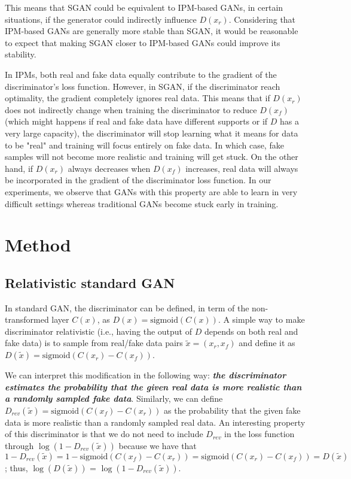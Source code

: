 \documentclass{article}
\begin{document}
This means that SGAN could be equivalent to IPM-based GANs, in certain situations, if the generator could indirectly influence $D(x_r)$. Considering that IPM-based GANs are generally more stable than SGAN, it would be reasonable to expect that making SGAN closer to IPM-based GANs could improve its stability. 

In IPMs, both real and fake data equally contribute to the gradient of the discriminator's loss function. However, in SGAN, if the discriminator reach optimality, the gradient completely ignores real data. This means that if $D(x_r)$ does not indirectly change when training the discriminator to reduce $D(x_f)$ (which might happens if real and fake data have different supports or if $D$ has a very large capacity), the discriminator will stop learning what it means for data to be "real" and training will focus entirely on fake data. In which case, fake samples will not become more realistic and training will get stuck. On the other hand, if $D(x_r)$ always decreases when $D(x_f)$ increases, real data will always be incorporated in the gradient of the discriminator loss function. In our experiments, we observe that GANs with this property are able to learn in very difficult settings whereas traditional GANs become stuck early in training.

\section{Method}

\subsection{Relativistic standard GAN}

In standard GAN, the discriminator can be defined, in term of the non-transformed layer $C(x)$, as $D(x)=\text{sigmoid}(C(x))$. A simple way to make discriminator relativistic (i.e., having the output of $D$ depends on both real and fake data) is to sample from real/fake data pairs $\tilde{x}=(x_r,x_f)$ and define it as $D(\tilde{x}) = \text{sigmoid}(C(x_r)-C(x_f))$. 

We can interpret this modification in the following way: \textbf{\textit{the discriminator estimates the probability that the given real data is more realistic than a randomly sampled fake data}}. Similarly, we can define $D_{rev}(\tilde{x}) = \text{sigmoid}(C(x_f)-C(x_r))$ as the probability that the given fake data is more realistic than a randomly sampled real data. An interesting property of this discriminator is that we do not need to include $D_{rev}$ in the loss function through $\log(1-D_{rev}(\tilde{x}))$ because we have that $1-D_{rev}(\tilde{x}) = 1 - \text{sigmoid}(C(x_f)-C(x_r)) = \text{sigmoid}(C(x_r)-C(x_f)) = D(\tilde{x})$; thus, $\log(D(\tilde{x}))$ = $\log(1-D_{rev}(\tilde{x}))$.
\end{document}
